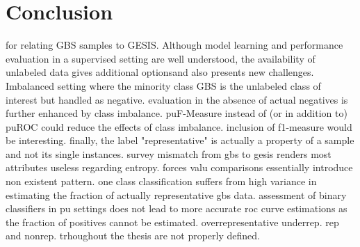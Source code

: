 \chapter{Conclusion}\label{Sec:Conclusion}

for relating GBS samples to GESIS. 
Although model learning and performance evaluation in a supervised setting are well understood, the availability of unlabeled data gives additional optionsand also presents new challenges.
Imbalanced setting where the minority class GBS is the unlabeled class of interest but handled as negative. evaluation in the absence of actual negatives is further enhanced by class imbalance. puF-Measure instead of (or in addition to) puROC could reduce the effects of class imbalance. inclusion of f1-measure would be interesting. finally, the label "representative" is actually a property of a sample and not its single instances. survey mismatch from gbs to gesis renders most attributes useless regarding entropy. forces valu comparisons essentially introduce non existent pattern. one class classification suffers from high variance in estimating the fraction of actually representative gbs data. assessment of binary classifiers in pu settings does not lead to more accurate roc curve estimations as the fraction of positives cannot be estimated. overrepresentative underrep. rep and nonrep. trhoughout the thesis are not properly defined.

